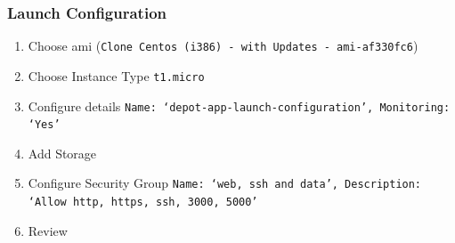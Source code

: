 \documentclass{beamer}
\begin{document}
\begin{frame}[fragile]
\frametitle{Launch Configuration}
\begin{enumerate}
\item Choose \acrshort{ami} (\texttt{Clone Centos (i386) - with Updates - ami-af330fc6})
\item Choose Instance Type \texttt{t1.micro}
\item Configure details \texttt{Name: `depot-app-launch-configuration', Monitoring: `Yes'}
\item Add Storage
\item Configure Security Group \texttt{Name: `web, ssh and data', Description: `Allow http, https, ssh, 3000, 5000'}
\item Review
\end{enumerate}
\end{frame}
\end{document}
